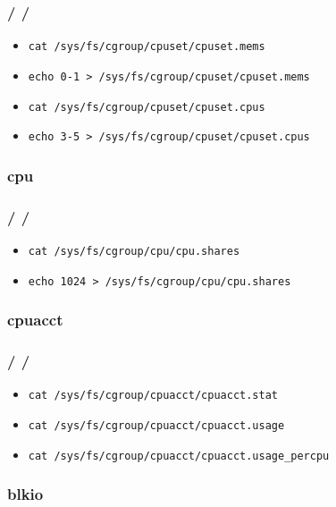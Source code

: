 \documentclass{beamer}
\newcommand{\autotitle}
{\frametitle{
    \secname
    \ifx\insertsubsection\empty
    \else
        /\subsecname
        \ifx\insertsubsubsection\empty\else/\subsubsecname\fi
    \fi}}
\begin{document}
\begin{frame}[fragile]
    \autotitle
    \begin{itemize}
        \item \verb|cat /sys/fs/cgroup/cpuset/cpuset.mems|
        \item \verb|echo 0-1 > /sys/fs/cgroup/cpuset/cpuset.mems|
        \item \verb|cat /sys/fs/cgroup/cpuset/cpuset.cpus|
        \item \verb|echo 3-5 > /sys/fs/cgroup/cpuset/cpuset.cpus|
    \end{itemize}
\end{frame}

\subsubsection{cpu}

\begin{frame}[fragile]
    \autotitle
    \begin{itemize}
        \item \verb|cat /sys/fs/cgroup/cpu/cpu.shares|
        \item \verb|echo 1024 > /sys/fs/cgroup/cpu/cpu.shares|
    \end{itemize}
\end{frame}

\subsubsection{cpuacct}

\begin{frame}[fragile]
    \autotitle
    \begin{itemize}
        \item \verb|cat /sys/fs/cgroup/cpuacct/cpuacct.stat|
        \item \verb|cat /sys/fs/cgroup/cpuacct/cpuacct.usage|
        \item \verb|cat /sys/fs/cgroup/cpuacct/cpuacct.usage_percpu|
    \end{itemize}
\end{frame}

\subsubsection{blkio}
\end{document}
